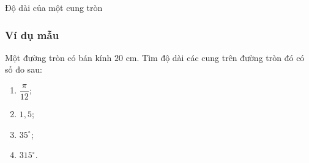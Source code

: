 

\begin{dang}{Độ dài của một cung tròn}
	
\end{dang}
\subsubsection{Ví dụ mẫu}
\begin{vd}%
	Một đường tròn có bán kính $20$ cm. Tìm độ dài các cung trên đường tròn đó có số đo sau:
	\begin{multicols}{4}
		\begin{enumerate}
			\item $\dfrac{\pi}{12}$;
			\item $1{,}5$;
			\item $35^\circ$;
			\item $315^\circ$.
		\end{enumerate}
	\end{multicols}
\end{vd}
